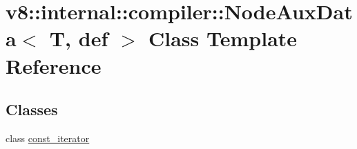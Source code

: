 \hypertarget{classv8_1_1internal_1_1compiler_1_1NodeAuxData}{}\section{v8\+:\+:internal\+:\+:compiler\+:\+:Node\+Aux\+Data$<$ T, def $>$ Class Template Reference}
\label{classv8_1_1internal_1_1compiler_1_1NodeAuxData}
\subsection*{Classes}
\begin{DoxyCompactItemize}
\item 
class \mbox{\hyperlink{classv8_1_1internal_1_1compiler_1_1NodeAuxData_1_1const__iterator}{const\+\_\+iterator}}
\end{DoxyCompactItemize}
